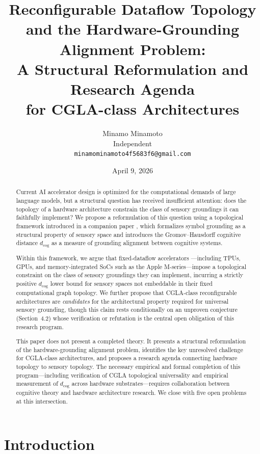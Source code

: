 \documentclass[12pt]{article}
\title{Reconfigurable Dataflow Topology and the Hardware-Grounding\\
Alignment Problem:\\
A Structural Reformulation and Research Agenda\\
for CGLA-class Architectures}
\author{Minamo Minamoto\\
\small Independent\\
\small \texttt{minamominamoto4f5683f6@gmail.com}}
\date{April 9, 2026}
\begin{document}
\maketitle

\begin{abstract}
Current AI accelerator design is optimized for the computational
demands of large language models, but a structural question has
received insufficient attention: does the topology of a hardware
architecture constrain the class of sensory groundings it can
faithfully implement? We propose a reformulation of this question
using a topological framework introduced in a companion paper
\cite{minamoto2026topology}, which formalizes symbol grounding as a
structural property of sensory space and introduces the
Gromov--Hausdorff cognitive distance $d_{\mathrm{cog}}$ as a
measure of grounding alignment between cognitive systems.

Within this framework, we argue that fixed-dataflow accelerators
---including TPUs, GPUs, and memory-integrated SoCs such as the
Apple M-series---impose a topological constraint on the class of
sensory groundings they can implement, incurring a strictly
positive $d_{\mathrm{cog}}$ lower bound for sensory spaces not
embeddable in their fixed computational graph topology. We further
propose that CGLA-class reconfigurable architectures are
\emph{candidates} for the architectural property required for
universal sensory grounding, though this claim rests conditionally
on an unproven conjecture (Section~4.2) whose verification or
refutation is the central open obligation of this research program.

This paper does not present a completed theory. It presents a
structural reformulation of the hardware-grounding alignment
problem, identifies the key unresolved challenge for CGLA-class
architectures, and proposes a research agenda connecting hardware
topology to sensory topology. The necessary empirical and formal
completion of this program---including verification of CGLA
topological universality and empirical measurement of
$d_{\mathrm{cog}}$ across hardware substrates---requires
collaboration between cognitive theory and hardware architecture
research. We close with five open problems at this intersection.
\end{abstract}

\tableofcontents

\newpage

\section{Introduction}
\end{document}
